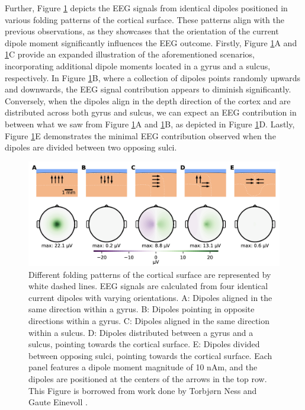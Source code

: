 \documentclass[a4paper, UKenglish, 11pt]{uiomaster}
\begin{document}
Further, Figure \ref{fig:dipole_orientation} depicts the EEG signals from identical dipoles positioned in various folding patterns of the cortical surface. These patterns align with the previous observations, as they showcases that the orientation of the current dipole moment significantly influences the EEG outcome. Firstly, Figure \ref{fig:dipole_orientation}A and \ref{fig:dipole_orientation}C provide an expanded illustration of the aforementioned scenarios, incorporating additional dipole moments located in a gyrus and a sulcus, respectively. In Figure \ref{fig:dipole_orientation}B, where a collection of dipoles points randomly upwards and downwards, the EEG signal contribution appears to diminish significantly. Conversely, when the dipoles align in the depth direction of the cortex and are distributed across both gyrus and sulcus, we can expect an EEG contribution in between what we saw from Figure \ref{fig:dipole_orientation}A and \ref{fig:dipole_orientation}B, as depicted in Figure \ref{fig:dipole_orientation}D. Lastly, Figure \ref{fig:dipole_orientation}E demonstrates the minimal EEG contribution observed when the dipoles are divided between two opposing sulci.


\begin{figure}[!htb]
    \centering
    \includegraphics[width=\linewidth]{figures/dipole_orientation.png}
    \caption{Different folding patterns of the cortical surface are represented by white dashed lines. EEG signals are calculated from four identical current dipoles with varying orientations. A: Dipoles aligned in the same direction within a gyrus. B: Dipoles pointing in opposite directions within a gyrus. C: Dipoles aligned in the same direction within a sulcus. D: Dipoles distributed between a gyrus and a sulcus, pointing towards the cortical surface. E: Dipoles divided between opposing sulci, pointing towards the cortical surface.
    Each panel features a dipole moment magnitude of 10 nAm, and the dipoles are positioned at the centers of the arrows in the top row. This Figure is borrowed from work done by Torbjørn Ness and Gaute Einevoll \cite{naess2021biophysically}.}
    \label{fig:dipole_orientation}
\end{figure}
\end{document}
